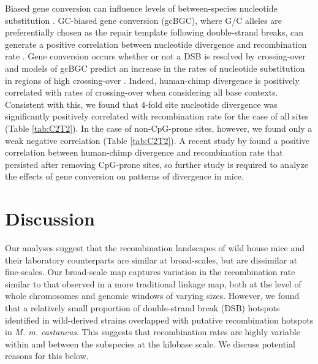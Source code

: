 	Biased gene conversion can influence levels of between-species nucleotide substitution \citep{RN331}. GC-biased gene conversion (gcBGC), where G/C alleles are preferentially chosen as the repair template following double-strand breaks, can generate a positive correlation between nucleotide divergence and recombination rate \citep{RN330}. Gene conversion occurs whether or not a DSB is resolved by crossing-over \citep{RN331} and models of gcBGC predict an increase in the rates of nucleotide substitution in regions of high crossing-over \citep{RN330}. Indeed, human-chimp divergence is positively correlated with rates of crossing-over when considering all base contexts. Consistent with this, we found that 4-fold site nucleotide divergence was significantly positively correlated with recombination rate for the case of all sites (Table \ref{tab:C2T2}). In the case of non-CpG-prone sites, however, we found only a weak negative correlation (Table \ref{tab:C2T2}). A recent study by \cite{RN332} found a positive correlation between human-chimp divergence and recombination rate that persisted after removing CpG-prone sites, so further study is required to analyze the effects of gene conversion on patterns of divergence in mice.

\linespread{1}

\linespread{2}

\section{Discussion}
 
	Our analyses suggest that the recombination landscapes of wild house mice and their laboratory counterparts are similar at broad-scales, but are dissimilar at fine-scales. Our broad-scale map captures variation in the recombination rate similar to that observed in a more traditional linkage map, both at the level of whole chromosomes and genomic windows of varying sizes. However, we found that a relatively small proportion of double-strand break (DSB) hotspots identified in wild-derived strains \citep{RN249} overlapped with putative recombination hotspots in \textit{M. m. castaneus}. This suggests that recombination rates are highly variable within and between the subspecies at the kilobase scale. We discuss potential reasons for this below.
 
